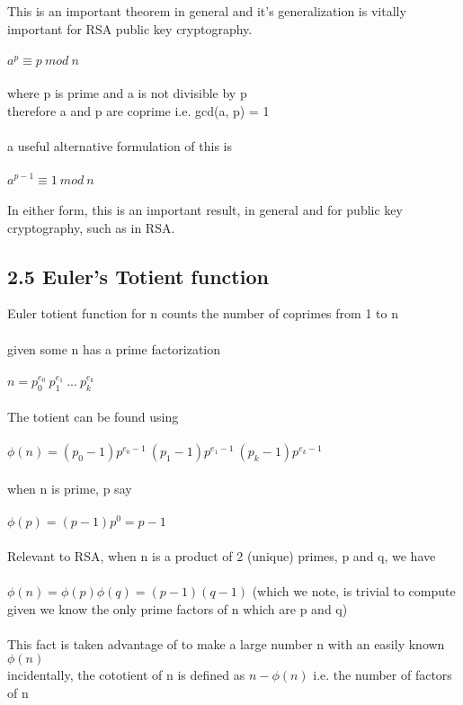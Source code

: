 \documentclass[11pt]{article}   	%
\begin{document}
This is an important theorem in general and it's generalization is vitally important for RSA public key cryptography.  \\
\\
\boldmath $ a^p \equiv p \ mod \ n $ \unboldmath \\
\\
where p is prime and a is not divisible by p \\
therefore a and p are coprime i.e. gcd(a, p) = 1 \\
\\
a useful alternative formulation of this is \\
\\
$ a^{p-1} \equiv 1 \ mod \ n $ \\
\\
In either form, this is an important result, in general and for public key cryptography, such as in RSA.


\subsection*{2.5 Euler's Totient function}

Euler totient function for n counts the number of coprimes from 1 to n \\
\\
given some n has a prime factorization \\
\\
$ n = p_0^{e_0} \ p_1^{e_1} \ ... \ p_k^{e_k} $ \\
\\
The totient can be found using \\
\\
$ \phi(n) = (p_0 - 1)p^{e_0 - 1} \ (p_1 - 1)p^{e_1 - 1} \ (p_k - 1)p^{e_k - 1} $ \\
\\
when n is prime, p say \\
\\
$ \phi(p) = (p-1)p^0 = p - 1 $ \\
\\
Relevant to RSA, when n is a product of 2 (unique) primes, p and q, we have \\
\\
$ \phi(n) = \phi(p)\phi(q) = (p-1)(q-1) $ (which we note, is trivial to compute given we know the only prime factors of n which are p and q) \\
\\
This fact is taken advantage of to make a large number n with an easily known $ \phi(n) $
\\
incidentally, the cototient of n is defined as $ n - \phi(n) $ i.e. the number of factors of n \\
\end{document}
